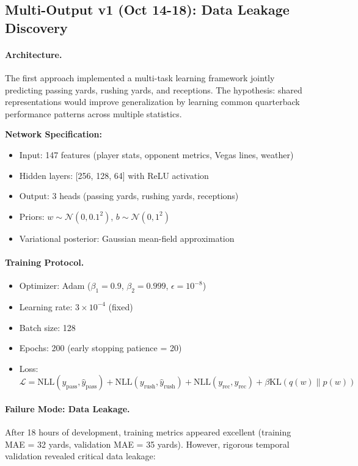 \subsection{Multi-Output v1 (Oct 14-18): Data Leakage Discovery}

\paragraph{Architecture.}
The first approach implemented a multi-task learning framework jointly predicting passing yards, rushing yards, and receptions. The hypothesis: shared representations would improve generalization by learning common quarterback performance patterns across multiple statistics.

\textbf{Network Specification:}
\begin{itemize}[itemsep=2pt,parsep=0pt]
    \item Input: 147 features (player stats, opponent metrics, Vegas lines, weather)
    \item Hidden layers: [256, 128, 64] with ReLU activation
    \item Output: 3 heads (passing yards, rushing yards, receptions)
    \item Priors: $w \sim \mathcal{N}(0, 0.1^2)$, $b \sim \mathcal{N}(0, 1^2)$
    \item Variational posterior: Gaussian mean-field approximation
\end{itemize}

\paragraph{Training Protocol.}
\begin{itemize}[itemsep=2pt,parsep=0pt]
    \item Optimizer: Adam ($\beta_1 = 0.9$, $\beta_2 = 0.999$, $\epsilon = 10^{-8}$)
    \item Learning rate: $3 \times 10^{-4}$ (fixed)
    \item Batch size: 128
    \item Epochs: 200 (early stopping patience = 20)
    \item Loss: $\mathcal{L} = \text{NLL}(y_{\text{pass}}, \hat{y}_{\text{pass}}) + \text{NLL}(y_{\text{rush}}, \hat{y}_{\text{rush}}) + \text{NLL}(y_{\text{rec}}, \hat{y}_{\text{rec}}) + \beta \text{KL}(q(w) \| p(w))$
\end{itemize}

\paragraph{Failure Mode: Data Leakage.}
After 18 hours of development, training metrics appeared excellent (training MAE = 32 yards, validation MAE = 35 yards). However, rigorous temporal validation revealed critical data leakage:

